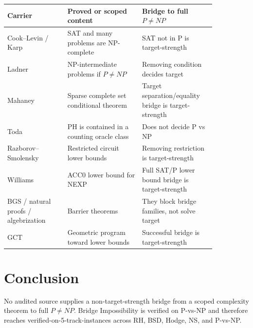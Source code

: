\documentclass{article}
\begin{document}
\begin{center}
\begin{tabular}{p{0.25\linewidth}p{0.31\linewidth}p{0.29\linewidth}}
\toprule
Carrier & Proved or scoped content & Bridge to full \(P\ne NP\)\\
\midrule
Cook--Levin / Karp & SAT and many problems are NP-complete & SAT not in P is target-strength\\
Ladner & NP-intermediate problems if \(P\ne NP\) & Removing condition decides target\\
Mahaney & Sparse complete set conditional theorem & Target separation/equality bridge is target-strength\\
Toda & PH is contained in a counting oracle class & Does not decide P vs NP\\
Razborov--Smolensky & Restricted circuit lower bounds & Removing restriction is target-strength\\
Williams & ACC0 lower bound for NEXP & Full SAT/P lower bound bridge is target-strength\\
BGS / natural proofs / algebrization & Barrier theorems & They block bridge families, not solve target\\
GCT & Geometric program toward lower bounds & Successful bridge is target-strength\\
\bottomrule
\end{tabular}
\end{center}

\section{Conclusion}

No audited source supplies a non-target-strength bridge from a scoped complexity theorem to full \(P\ne NP\). Bridge Impossibility is verified on P-vs-NP and therefore reaches verified-on-5-track-instances across RH, BSD, Hodge, NS, and P-vs-NP.
\end{document}

